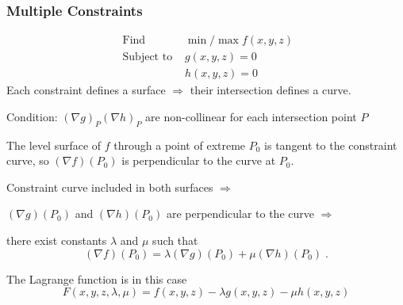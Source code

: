\begin{frame}
  \frametitle{Multiple Constraints}

\begin{align*}
  \text{ Find } & \min/\max f(x,y,z) \\
  \text{ Subject to } & g(x,y,z) = 0 \\
                      & h(x,y,z) = 0
\end{align*}
%
\pause
Each constraint defines a surface $\Longrightarrow$ their intersection defines a curve.

\pause
Condition: $(\nabla g)_P$$(\nabla h)_P$ are non-collinear for each intersection point $P$

The level surface of $f$ through a point of extreme $P_0$ is tangent to the constraint curve, so $(\nabla f)(P_0)$ is perpendicular to the curve at $P_0$.

Constraint curve included in both surfaces $\Longrightarrow$

$(\nabla g)(P_0)$ and $(\nabla h)(P_0)$ are perpendicular to the curve $\Longrightarrow$

\pause
there exist constants $\lambda$ and $\mu$ such that
%
$$(\nabla f)(P_0) = \lambda (\nabla g)(P_0) + \mu (\nabla h)(P_0)\; .$$

\pause
The Lagrange function is in this case
%
$$F(x,y,z,\lambda,\mu) = f(x,y,z) - \lambda g(x,y,z) - \mu h(x,y,z)$$

\end{frame}
